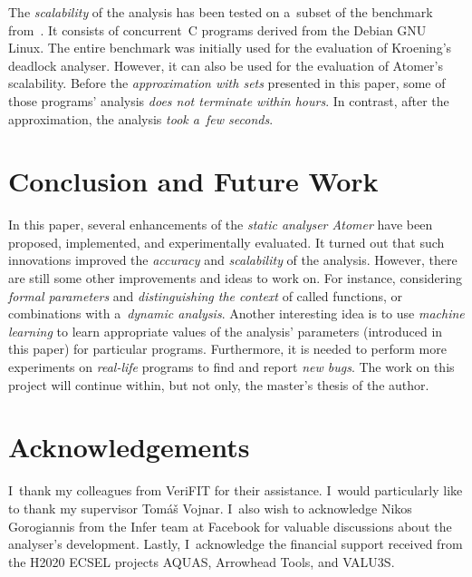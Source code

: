 \documentclass{ExcelAtFIT}
\theoremstyle{example}
\begin{document}
The \emph{scalability} of the analysis has been tested on a~subset of the benchmark from~\cite{deadlockKroening}. It consists of concurrent~C programs derived from the Debian GNU Linux. The entire benchmark was initially used for the evaluation of Kroening's deadlock analyser. However, it can also be used for the evaluation of Atomer's scalability. Before the \emph{approximation with sets} presented in this paper, some of those programs' analysis \emph{does not terminate within hours}. In contrast, after the approximation, the analysis \emph{took a~few seconds}.


\section{Conclusion and Future Work}
\label{sec:conc}

In this paper, several enhancements of the \emph{static analyser Atomer} have been proposed, implemented, and experimentally evaluated. It turned out that such innovations improved the \emph{accuracy} and \emph{scalability} of the analysis. However, there are still some other improvements and ideas to work on. For instance, considering \emph{formal parameters} and \emph{distinguishing the context} of called functions, or combinations with a~\emph{dynamic analysis}. Another interesting idea is to use \emph{machine learning} to learn appropriate values of the analysis' parameters (introduced in this paper) for particular programs. Furthermore, it is needed to perform more experiments on \emph{real-life} programs to find and report \emph{new bugs}. The work on this project will continue within, but not only, the master's thesis of the author.


\section*{Acknowledgements}
I~thank my colleagues from VeriFIT for their assistance. I~would particularly like to thank my supervisor Tomáš Vojnar. I~also wish to acknowledge Nikos Gorogiannis from the Infer team at Facebook for valuable discussions about the analyser’s development. Lastly, I~acknowledge the financial support received from the H2020 ECSEL projects AQUAS, Arrowhead Tools, and VALU3S.



\setlength{\bibsep}{.05em}
\apptocmd{\sloppy}{\hbadness 10000 \relax}{}{}



\end{document}
